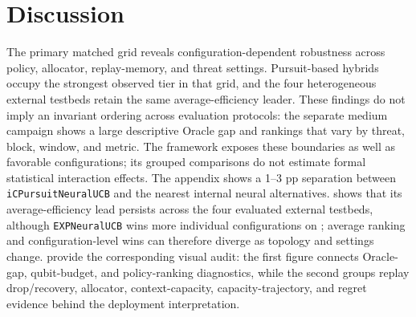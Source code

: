 \section{Discussion}
\label{sec:discussion}

The primary matched grid reveals configuration-dependent robustness across policy, allocator, replay-memory, and threat settings. Pursuit-based hybrids occupy the strongest observed tier in that grid, and the four heterogeneous external testbeds retain the same average-efficiency leader. These findings do not imply an invariant ordering across evaluation protocols: the separate medium campaign shows a large descriptive Oracle gap and rankings that vary by threat, block, window, and metric. The framework exposes these boundaries as well as favorable configurations; its grouped comparisons do not estimate formal statistical interaction effects.
The appendix  shows a 1--3 pp separation between \texttt{iCPursuitNeuralUCB} and the nearest internal neural alternatives.  shows that its average-efficiency lead persists across the four evaluated external testbeds, although \texttt{EXPNeuralUCB} wins more individual configurations on \paperEight; average ranking and configuration-level wins can therefore diverge as topology and settings change.
 provide the corresponding visual audit: the first figure connects Oracle-gap, qubit-budget, and policy-ranking diagnostics, while the second groups replay drop/recovery, allocator, context-capacity, capacity-trajectory, and regret evidence behind the deployment interpretation.


